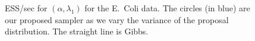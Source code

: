 \begin{figure}[H]
\begin{minipage}[!hp]{.68\linewidth}
  \end{minipage}  
  \begin{minipage}[!hp]{.01\linewidth}
  \end{minipage}
  \begin{minipage}[!hp]{.3\linewidth}
    \caption{ESS/sec for $(\alpha,\lambda_1)$ for the E.\ Coli data. The circles (in blue) are our 
      proposed sampler as we vary the variance of the proposal distribution. 
      The straight line is Gibbs. }
     \label{fig:ECOLI}
  \end{minipage}  

  \end{figure}




